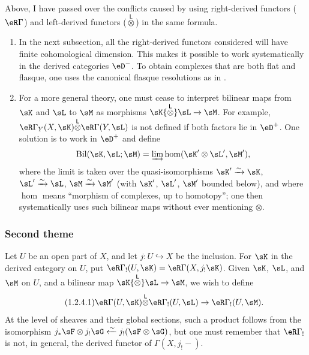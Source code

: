\documentclass[12pt,oneside,english]{smfbook}
\newcommand{\iso}{\xrightarrow\sim}
\newcommand{\lotimes}{{\overset{\mathsf{L}}{\otimes}}}
\begin{document}
\subsubsection{}\label{IV:1-2-3}

Above, I have passed over the conflicts caused by using right-derived functors ($\eR\Gamma$) and left-derived functors ($\lotimes$) in the same formula.
\begin{enumerate}[\indent a)]
  \item In the next subsection, all the right-derived functors considered will have finite cohomological dimension. This makes it possible to work systematically in the derived categories $\eD^-$. To obtain complexes that are both flat and flasque, one uses the canonical flasque resolutions as in \cite[XVII]{sga4}.
  \item For a more general theory, one must cease to interpret bilinear maps from $\sK$ and $\sL$ to $\sM$ as morphisms $\sK\lotimes\sL\to\sM$. For example, $\eR\Gamma_Y(X,\sK)\lotimes\eR\Gamma(Y,\sL)$ is not defined if both factors lie in $\eD^+$. One solution is to work in $\eD^+$ and define
    \[
      \operatorname{Bil}(\sK,\sL;\sM) = \varinjlim \hom(\sK'\otimes\sL',\sM') \text{,}
    \]
    where the limit is taken over the quasi-isomorphisms $\sK'\iso\sK$, $\sL'\iso\sL$, $\sM\iso\sM'$ (with $\sK'$, $\sL'$, $\sM'$ bounded below), and where $\hom$ means ``morphism of complexes, up to homotopy''; one then systematically uses such bilinear maps without ever mentioning $\otimes$.
\end{enumerate}

\subsubsection{Second theme}\label{IV:1-2-4}

Let $U$ be an open part of $X$, and let $j:U\hookrightarrow X$ be the inclusion. For $\sK$ in the derived category on $U$, put $\eR\Gamma_!(U,\sK)=\eR\Gamma(X,j_!\sK)$. Given $\sK$, $\sL$, and $\sM$ on $U$, and a bilinear map $\sK\lotimes\sL\to\sM$, we wish to define
\begin{equation*}\tag{1.2.4.1}\label{IV:eq:1-2-4-1}
  \eR\Gamma(U,\sK)\lotimes\eR\Gamma_!(U,\sL)\to\eR\Gamma_!(U,\sM) \text{.}
\end{equation*}
At the level of sheaves and their global sections, such a product follows from the isomorphism $j_*\sF\otimes j_!\sG\xleftarrow\sim j_!(\sF\otimes\sG)$, but one must remember that $\eR\Gamma_!$ is not, in general, the derived functor of $\Gamma(X,j_!-)$.
\end{document}
